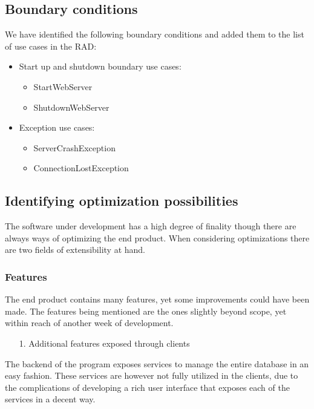 \subsection{Boundary conditions}

We have identified the following boundary conditions and added them to the list of use cases in the RAD:

\begin{itemize}
	\item Start up and shutdown boundary use cases:
	\begin{itemize}
			\item StartWebServer
			\item ShutdownWebServer
	\end{itemize}
	\item Exception use cases:
	\begin{itemize}
			\item ServerCrashException
			\item ConnectionLostException
	\end{itemize}
\end{itemize}

\subsection{Identifying optimization possibilities}

The software under development has a high degree of finality though there are always ways of optimizing the end product.
When considering optimizations there are two fields of extensibility at hand.

\subsubsection{Features}

The end product contains many features, yet some improvements could have been made.
The features being mentioned are the ones slightly beyond scope, yet within reach of another week of development.

\begin{enumerate}
\item[1.] Additional features exposed through clients
\end{enumerate}
The backend of the program exposes services to manage the entire database in an easy fashion. These services are however not fully utilized in the clients, due to the complications of developing a rich user interface that exposes each of the services in a decent way.

